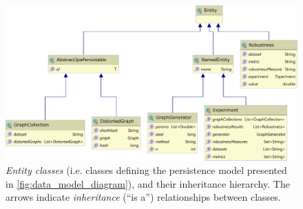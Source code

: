\begin{figure}
\includegraphics[width=\linewidth]{data_model_classes_diagram.pdf}
\caption{\textsl{Entity classes} (i.e. classes defining the persistence model presented in \autoref{fig:data_model_diagram}), and their inheritance hierarchy.
The arrows indicate \textsl{inheritance} (``is a'') relationships between classes.}
\label{fig:data_model_classes_diagram}
\end{figure}
